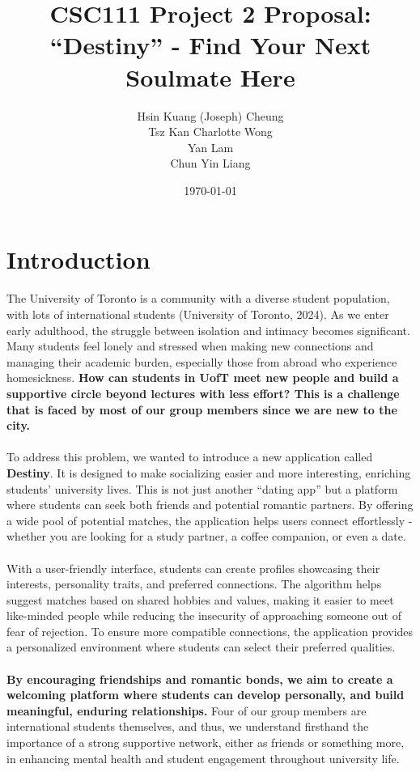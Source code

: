\documentclass[fontsize=11pt]{article}
\title{CSC111 Project 2 Proposal: \\ \textbf{“Destiny” - Find Your Next Soulmate Here}}
\author{Hsin Kuang (Joseph) Cheung \\ Tsz Kan Charlotte Wong \\ Yan Lam \\ Chun Yin Liang}
\date{\today}
\begin{document}
\maketitle

\section*{Introduction}

The University of Toronto is a community with a diverse student population, with lots of international students (University of Toronto, 2024).
As we enter early adulthood, the struggle between isolation and intimacy becomes significant.
Many students feel lonely and stressed when making new connections and managing their academic burden, especially those from abroad who experience homesickness.
\textbf{How can students in UofT meet new people and build a supportive circle beyond lectures with less effort?
This is a challenge that is faced by most of our group members since we are new to the city.}
\\
\\
To address this problem, we wanted to introduce a new application called \textbf{Destiny}.
It is designed to make socializing easier and more interesting, enriching students’ university lives.
This is not just another “dating app” but a platform where students can seek both friends and potential romantic partners. By offering a wide pool of potential matches, the application helps users connect effortlessly - whether you are looking for a study partner, a coffee companion, or even a date.
\\
\\
With a user-friendly interface, students can create profiles showcasing their interests, personality traits, and preferred connections.
The algorithm helps suggest matches based on shared hobbies and values, making it easier to meet like-minded people while reducing the insecurity of approaching someone out of fear of rejection. To ensure more compatible connections, the application provides a personalized environment where students can select their preferred qualities.
\\
\\
\textbf{By encouraging friendships and romantic bonds, we aim to create a welcoming platform where students can develop personally, and build meaningful, enduring relationships.}
Four of our group members are international students themselves, and thus, we understand firsthand the importance of a strong supportive network, either as friends or something more, in enhancing mental health and student engagement throughout university life.
\end{document}
